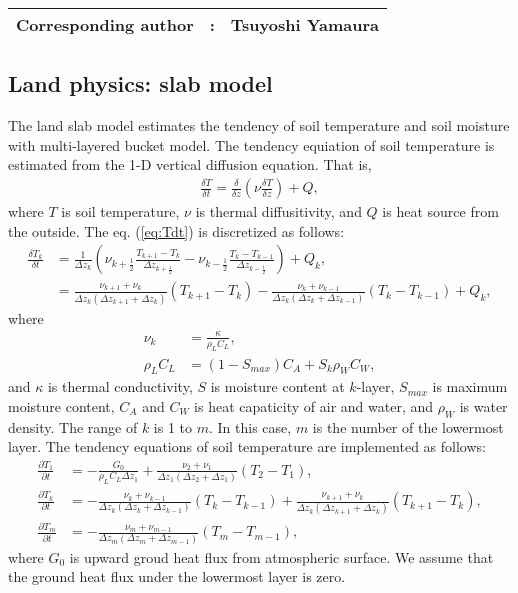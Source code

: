 {\bf \Large 
\begin{tabular}{ccc}
\hline
  Corresponding author & : & Tsuyoshi Yamaura\\
\hline
\end{tabular}
}


\subsection{Land physics: slab model}

The land slab model estimates the tendency of soil temperature and soil moisture with multi-layered bucket model.
The tendency equiation of soil temperature is estimated from the 1-D vertical diffusion equation.
That is,
\begin{align}
  \frac{\delta T}{\delta t} = \frac{\delta}{\delta z} \left( \nu \frac{\delta T}{\delta z} \right) + Q,
  \label{eq:Tdt}
\end{align}
where $T$ is soil temperature, $\nu$ is thermal diffusitivity, and $Q$ is heat source from the outside.
The eq. (\ref{eq:Tdt}) is discretized as follows:
\begin{align}
  \frac{\delta T_{k}}{\delta t} &= \frac{1}{\Delta z_{k}} \left( \nu_{k+\frac{1}{2}} \frac{T_{k+1}-T_{k}}{\Delta z_{k+\frac{1}{2}}} - \nu_{k-\frac{1}{2}} \frac{T_{k}-T_{k-1}}{\Delta z_{k-\frac{1}{2}}} \right) + Q_{k}, \\
                                &= \frac{ \nu_{k+1}+\nu_{k} }{ \Delta z_{k} (\Delta z_{k+1}+\Delta z_{k}) }(T_{k+1}-T_{k}) - \frac{ \nu_{k}+\nu_{k-1} }{ \Delta z_{k} (\Delta z_{k}+\Delta z_{k-1}) }(T_{k}-T_{k-1}) + Q_{k},
\end{align}
where
\begin{align}
  \nu_{k} &= \frac{\kappa}{\rho_{L}C_{L}}, \\
  \rho_{L}C_{L} &= ( 1 - S_{max} ) C_{A} + S_{k} \rho_{W}C_{W},
\end{align}
and $\kappa$ is thermal conductivity, $S$ is moisture content at $k$-layer, $S_{max}$ is maximum moisture content, $C_{A}$ and $C_{W}$ is heat capaticity of air and water, and $\rho_{W}$ is water density.
The range of $k$ is 1 to $m$.
In this case, $m$ is the number of the lowermost layer.
The tendency equations of soil temperature are implemented as follows:
\begin{align}
  \frac{\partial T_{1}}{\partial t} &= - \frac{G_{0}}{\rho_{L}C_{L}\Delta z_{1}} + \frac{\nu_{2}+\nu_{1}}{\Delta z_{1}(\Delta z_{2}+\Delta z_{1})} (T_{2}-T_{1}), \\
  \frac{\partial T_{k}}{\partial t} &= - \frac{\nu_{k}+\nu_{k-1}}{\Delta z_{k}(\Delta z_{k}+\Delta z_{k-1})} (T_{k}-T_{k-1}) + \frac{\nu_{k+1}+\nu_{k}}{\Delta z_{k}(\Delta z_{k+1}+\Delta z_{k})} (T_{k+1}-T_{k}), \\
  \frac{\partial T_{m}}{\partial t} &= - \frac{\nu_{m}+\nu_{m-1}}{\Delta z_{m}(\Delta z_{m}+\Delta z_{m-1})} (T_{m}-T_{m-1}),
\end{align}
where $G_{0}$ is upward groud heat flux from atmospheric surface.
We assume that the ground heat flux under the lowermost layer is zero.

